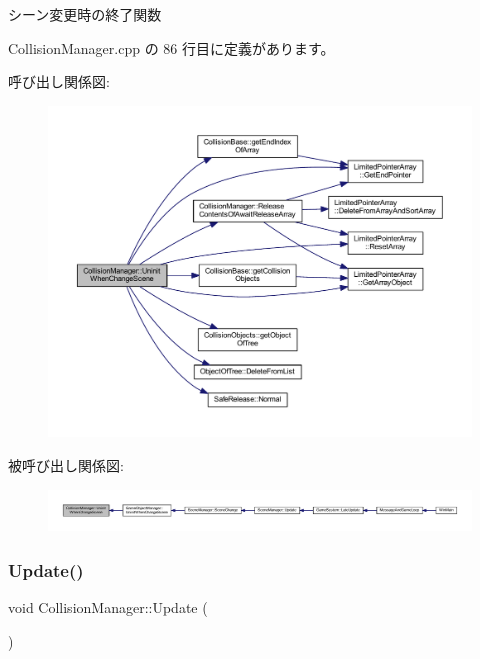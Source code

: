 シーン変更時の終了関数 



 Collision\+Manager.\+cpp の 86 行目に定義があります。

呼び出し関係図\+:
\nopagebreak
\begin{figure}[H]
\begin{center}
\leavevmode
\includegraphics[width=350pt]{class_collision_manager_a33ce56b5a6f68d71b0f2bf733413dddb_cgraph}
\end{center}
\end{figure}
被呼び出し関係図\+:
\nopagebreak
\begin{figure}[H]
\begin{center}
\leavevmode
\includegraphics[width=350pt]{class_collision_manager_a33ce56b5a6f68d71b0f2bf733413dddb_icgraph}
\end{center}
\end{figure}
\mbox{\label{class_collision_manager_a23c21d077dbfd7ca86e7c0649d775dfc}} 
\subsubsection{\texorpdfstring{Update()}{Update()}}
{\footnotesize\ttfamily void Collision\+Manager\+::\+Update (\begin{DoxyParamCaption}{ }\end{DoxyParamCaption})}



